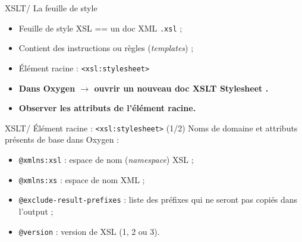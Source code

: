 \documentclass{beamer}
\begin{document}
    \begin{frame}{XSLT/ La feuille de style}
    \Large
        \begin{itemize}
            \item Feuille de style XSL == un doc XML \texttt{.xsl} ;
            \item Contient des instructions ou règles (\textit{templates})  ;
            \item Élément racine : \texttt{<xsl:stylesheet>}
        \end{itemize}
        \bigskip
        \bigskip
        \begin{itemize}
            \item \textbf{Dans Oxygen $\rightarrow$ ouvrir un nouveau doc \og XSLT Stylesheet \fg.}
            \item \textbf{Observer les attributs de l'élément racine.}
        \end{itemize}
    \end{frame}

    \begin{frame}{XSLT/ Élément racine : \texttt{<xsl:stylesheet>} (1/2)}
    \Large
    Noms de domaine et attributs présents de base dans Oxygen :
        \begin{itemize}
            \item \texttt{@xmlns:xsl} : espace de nom (\textit{namespace}) XSL ;
            \item \texttt{@xmlns:xs} : espace de nom XML ;
            \item \texttt{@exclude-result-prefixes} : liste des préfixes qui ne seront pas copiés dans l'output ;
            \item \texttt{@version} : version de XSL (1, 2 ou 3).
        \end{itemize}
    \end{frame}
\end{document}
